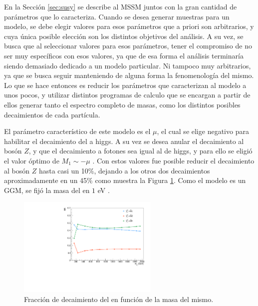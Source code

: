 En la Sección \ref{sec:susy} se describe al MSSM juntos con la gran cantidad de parámetros que lo caracteriza. Cuando se desea generar muestras para un modelo, se debe elegir valores para esos parámetros que a priori son arbitrarios, y cuya única posible elección son los distintos objetivos del análisis. A su vez, se busca que al seleccionar valores para esos parámetros, tener el compromiso de no ser muy específicos con esos valores, ya que de esa forma el análisis terminaría siendo demasiado dedicado a un modelo particular. Ni tampoco muy arbitrarios, ya que se busca seguir manteniendo de alguna forma la fenomenología del mismo. Lo que se hace entonces es reducir los parámetros que caracterizan al modelo a unos pocos, y utilizar distintos programas de calculo que se encargan a partir de ellos generar tanto el espectro completo de masas, como los distintos posibles decaimientos de cada partícula.

El parámetro característico de este modelo es el $\mu$, el cual se elige negativo para habilitar el decaimiento del \ninoone a higgs. A su vez se desea anular el decaimiento al bosón $Z$, y que el decaimiento a fotones sea igual al de higgs, y para ello se eligió el valor óptimo de $M_1\sim -\mu$ . Con estos valores fue posible reducir el decaimiento al bosón $Z$ hasta casi un 10\%, dejando a los otros dos decaimientos aproximadamente en un 45\% como muestra la Figura \ref{fig:n1_br}. Como el modelo es un GGM, se fijó la masa del \gravino en $1$ eV . 

\begin{figure}
  \centering
  \includegraphics[width=0.6\textwidth]{images/analysis/phb_n1_br.pdf}
  \caption{Fracción de decaimiento del \ninoone en función de la masa del mismo.}
  \label{fig:n1_br}
\end{figure}

